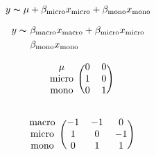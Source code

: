 \begin{lrbox}{\saveBoxFive}
	\begin{minipage}{5.3cm}
		\[ y \thicksim \mu + \beta_{\text{micro}} x_{\text{micro}} + \beta_{\text{mono}} x_{\text{mono}}\] 
	\end{minipage}
\end{lrbox}

\begin{lrbox}{\saveBoxSix}
	\begin{minipage}{5.3cm}
		\[ \begin{split}
		y \thicksim \ & \beta_{\text{macro}} x_{\text{macro}} + \beta_{\text{micro}} x_{\text{micro}} \\
		& \beta_{\text{mono}} x_{\text{mono}}
		\end{split} \]
	\end{minipage}
\end{lrbox}

\begin{lrbox}{\saveBoxSeven}
			\begin{minipage}{5.3cm}
				\[
					\begin{blockarray}{ccc}
						\begin{block}{c(cc)}
						\mu          & 0 & 0 \\
						\text{micro} & 1 & 0 \\
						\text{mono}  & 0 & 1 \\
						\end{block}
					\end{blockarray}
				\]
		\end{minipage}
\end{lrbox}

\begin{lrbox}{\saveBoxEight}
	\begin{minipage}{5.3cm}
			\[
			\begin{blockarray}{cccc}
			\begin{block}{c(ccc)}
			\text{macro} & -1 & -1 & 0\\
			\text{micro} & 1 & 0 & -1 \\
			\text{mono}  & 0 & 1 & 1 \\
			\end{block}
			\end{blockarray}
			\]
	\end{minipage}
\end{lrbox}

